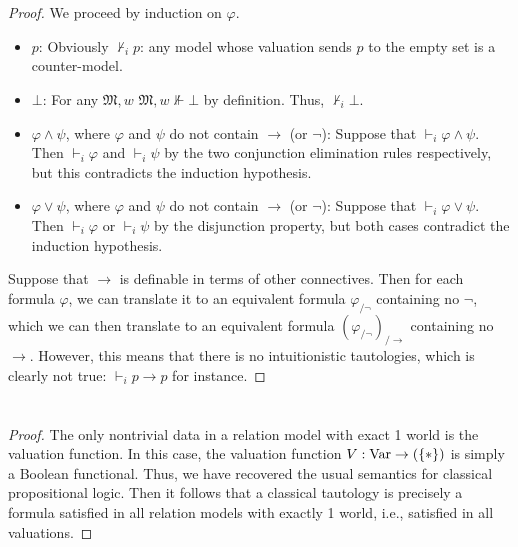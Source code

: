 \documentclass[a4paper]{article}
\newcommand{\M}{\mathfrak{M}}
\let\P\relax
\newcommand{\P}{\mathcal{P}}
\newcommand{\Var}{\text{Var}}
\newcommand{\set}[1]{\mathopen{}\{#1\mathclose{}\}}
\newcommand{\modImp}[1]{{#1}_{/\to}}
\newcommand{\modNot}[1]{{#1}_{/\lnot}}
\begin{document}
\section{}
\label{sec:2}

\begin{proof}
  We proceed by induction on $\varphi$.
  \begin{itemize}
  \item $p$: Obviously $\nvdash_i p$: any model whose valuation sends $p$ to the empty set is a counter-model.
  \item $\bot$: For any $\M, w$ $\M, w \nVdash \bot$ by definition.
    Thus, $\nvdash_i \bot$.
  \item $\varphi \wedge \psi$, where $\varphi$ and $\psi$ do not contain $\to$ (or $\lnot$): Suppose that $\vdash_i \varphi \wedge \psi$.
    Then $\vdash_i \varphi$ and $\vdash_i \psi$ by the two conjunction elimination rules respectively, but this contradicts the induction hypothesis.
  \item $\varphi \vee \psi$, where $\varphi$ and $\psi$ do not contain $\to$ (or $\lnot$): Suppose that $\vdash_i \varphi \vee \psi$.
    Then $\vdash_i \varphi$ or $\vdash_i \psi$ by the disjunction property, but both cases contradict the induction hypothesis.
  \end{itemize}
  Suppose that $\to$ is definable in terms of other connectives.
  Then for each formula $\varphi$, we can translate it to an equivalent formula $\modNot{\varphi}$ containing no $\lnot$, which we can then translate to an equivalent formula $\modImp{(\modNot{\varphi})}$ containing no $\to$.
  However, this means that there is no intuitionistic tautologies, which is clearly not true: $\vdash_i p \to p$ for instance.
\end{proof}

\section{}
\label{sec:3}

\begin{proof}
  The only nontrivial data in a relation model with exact 1 world is the valuation function.
  In this case, the valuation function $V: \Var \to \P(\set{*})$ is simply a Boolean functional.
  Thus, we have recovered the usual semantics for classical propositional logic.
  Then it follows that a classical tautology is precisely a formula satisfied in all relation models with exactly 1 world, i.e., satisfied in all valuations.
\end{proof}
\end{document}
